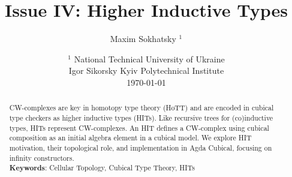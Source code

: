 \documentclass{article}
\theoremstyle{definition}
\begin{document}
\title{Issue IV: Higher Inductive Types}
\author{Maxim Sokhatsky $^1$}
\date{ $^1$ National Technical University of Ukraine \\
       \small Igor Sikorsky Kyiv Polytechnical Institute \\
       \today }
\maketitle

\begin{abstract}
CW-complexes are key in homotopy type theory (HoTT) and are encoded
in cubical type checkers as higher inductive types (HITs). Like
recursive trees for (co)inductive types, HITs represent CW-complexes.
An HIT defines a CW-complex using cubical composition as an initial
algebra element in a cubical model. We explore HIT motivation, their
topological role, and implementation in Agda Cubical, focusing on infinity constructors. \\
{\bf Keywords}: Cellular Topology, Cubical Type Theory, HITs
\end{abstract}

\tableofcontents
\end{document}
